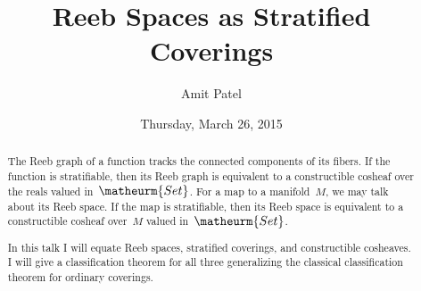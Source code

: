 \documentclass{UAmathtalk}
\author{Amit Patel}
\title{Reeb Spaces as Stratified Coverings}
\date{Thursday, March 26, 2015}
\begin{document}
\maketitle

\begin{abstract}
The Reeb graph of a function tracks the connected components of its fibers.
If the function is stratifiable, then its Reeb graph is equivalent to a constructible cosheaf over the reals valued in~$\matheurm{Set}$.
For a map to a manifold~$M$, we may talk about its Reeb space.
If the map is stratifiable, then its Reeb space is equivalent to a constructible cosheaf over~$M$ valued in~$\matheurm{Set}$.

In this talk I will equate Reeb spaces, stratified coverings, and constructible cosheaves.
I will give a classification theorem for all three generalizing the classical classification theorem for ordinary coverings.
\end{abstract}
\end{document}
